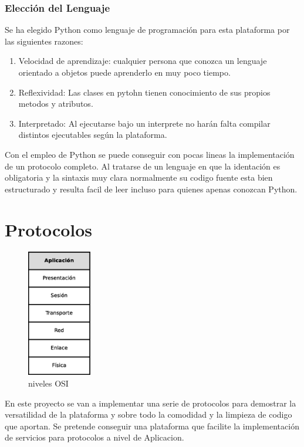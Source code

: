 \documentclass[a4paper,spanish,12pt]{book}
\begin{document}
\subsection{Elecci\'on del Lenguaje} 
Se ha elegido Python como lenguaje de programaci\'on para esta plataforma por las siguientes razones:
\begin{enumerate}
	\item Velocidad de aprendizaje: cualquier persona que conozca un lenguaje orientado a objetos puede aprenderlo en muy poco tiempo.
	\item Reflexividad: Las clases en pytohn tienen conocimiento de sus propios metodos y atributos.
	\item Interpretado: Al ejecutarse bajo un interprete no har\'an falta compilar distintos ejecutables seg\'un la plataforma.
\end{enumerate}

Con el empleo de Python se puede conseguir con pocas lineas la implementaci\'on de un protocolo completo. Al tratarse de un lenguaje en que la identaci\'on es obligatoria y la sintaxis muy clara normalmente su codigo fuente esta bien estructurado y resulta facil de leer incluso para quienes apenas conozcan Python.

\chapter{Protocolos}

\begin{figure}
	\includegraphics[width=0.25\textwidth]{img/NivelesOSI.eps}
              \caption{niveles OSI}
  \label{fig:nivelesOSI}
\end{figure}

En este proyecto se van a implementar una serie de protocolos para demostrar la versatilidad de la plataforma y sobre todo la comodidad y la limpieza de codigo que aportan. Se pretende conseguir una plataforma que facilite la implementación de servicios para protocolos a nivel de Aplicacion.
\end{document}
